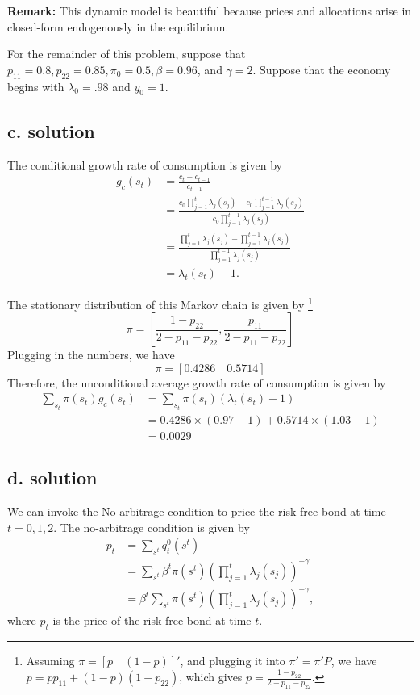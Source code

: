 \documentclass[11pt]{article}
\theoremstyle{definition}
\theoremstyle{boldtitle} %
\numberwithin{equation}{section}
\numberwithin{figure}{section}
\numberwithin{table}{section}
\begin{document}
\noindent \textbf{Remark:} This dynamic model is beautiful because prices and allocations arise in closed-form endogenously in the equilibrium.


For the remainder of this problem, suppose that 
$p_{11} = 0.8, p_{22} = 0.85, \pi_0 = 0.5, \beta = 0.96$, and 
$\gamma = 2$.
Suppose that the economy begins with $\lambda_0 = .98$ and $y_0 = 1$.



\subsection{c. solution}
The conditional growth rate of consumption is given by 
\begin{align*}
g_{c}(s_t) &= \frac{c_t - c_{t-1}}{c_{t-1}} \\ 
  & = \frac{c_0 \prod_{j=1}^t \lambda_j(s_j) - c_0 \prod_{j=1}^{t-1} \lambda_j(s_j)}{c_0 \prod_{j=1}^{t-1} \lambda_j(s_j)} \\ 
  & = \frac{ \prod_{j=1}^t \lambda_j(s_j) -  \prod_{j=1}^{t-1} \lambda_j(s_j)}{\prod_{j=1}^{t-1} \lambda_j(s_j)} \\
  & = \lambda_t(s_t) - 1.
\end{align*}

The stationary distribution of this Markov chain is given by%
\footnote{
  Assuming $\pi = [p \quad (1-p)]'$, and plugging it into $\pi' = \pi' P$,
  we have $p = p p_{11} + (1-p)(1 - p_{22})$,
  which gives $p = \frac{1 - p_{22}}{2 - p_{11} - p_{22}}$.
}
\[
\pi = \left[\frac{1 - p_{22}}{2 - p_{11} - p_{22}}, \frac{p_{11}}{2 - p_{11} - p_{22}} \right]
\]
Plugging in the numbers, we have
\[
\pi = [0.4286\quad 0.5714]
\]
Therefore, the unconditional average growth rate of consumption is given by
\begin{align*}
\sum_{s_t} \pi(s_t) g_c(s_t) & = \sum_{s_t} \pi(s_t) \left(\lambda_t(s_t) - 1\right) \\ 
& = 0.4286 \times (0.97 - 1) + 0.5714 \times (1.03 - 1) \\
& = 0.0029
\end{align*}


\subsection{d. solution}
We can invoke the No-arbitrage condition to price the risk free bond at time $t = 0, 1, 2$.
The no-arbitrage condition is given by
\begin{align*}
p_t & = \sum_{s^t} q^0_t(s^t) \\
& = \sum_{s^t} \beta^t \pi(s^t) \left( \prod_{j=1}^t \lambda_j(s_j) \right)^{- \gamma} \\
& = \beta^t \sum_{s^t}  \pi(s^t) \left( \prod_{j=1}^t \lambda_j(s_j) \right)^{- \gamma},
\end{align*}
where $p_t$ is the price of the risk-free bond at time $t$.
\end{document}
